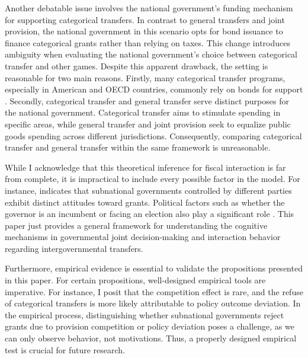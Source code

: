 Another debatable issue involves the national government's funding mechanism for supporting categorical transfers. In contrast to general transfers and joint provision, the national government in this scenario opts for bond issuance to finance categorical grants rather than relying on taxes. This change introduces ambiguity when evaluating the national government's choice between categorical transfer and other games. Despite this apparent drawback, the setting is reasonable for two main reasons. Firstly, many categorical transfer programs, especially in American and OECD countries, commonly rely on bonds for support \parencite{spahn2012conditioning,de2007local,weist2007intergovernmental}. Secondly, categorical transfer and general transfer serve distinct purposes for the national government. Categorical transfer aims to stimulate spending in specific areas, while general transfer and joint provision seek to equalize public goods spending across different jurisdictions. Consequently, comparing categorical transfer and general transfer within the same framework is unreasonable.%

While I acknowledge that this theoretical inference for fiscal interaction is far from complete, it is impractical to include every possible factor in the model. For instance, \Textcite{nicholson2012leaving} indicates that subnational governments controlled by different parties exhibit distinct attitudes toward grants. Political factors such as whether the governor is an incumbent or facing an election also play a significant role \parencite{nordhaus1975political, macrae1977political}. This paper just provides a general framework for understanding the cognitive mechanisms in governmental joint decision-making and interaction behavior regarding intergovernmental transfers.

Furthermore, empirical evidence is essential to validate the propositions presented in this paper. For certain propositions, well-designed empirical tools are imperative. For instance, I posit that the competition effect is rare, and the refuse of categorical transfers is more likely attributable to policy outcome deviation. In the empirical process, distinguishing whether subnational governments reject grants due to provision competition or policy deviation poses a challenge, as we can only observe behavior, not motivations. Thus, a properly designed empirical test is crucial for future research.